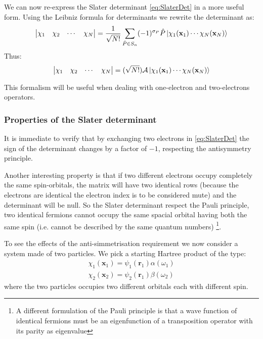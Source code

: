 \documentclass[a4paper,12pt]{article}
\begin{document}
We can now re-express the Slater determinant \eqref{eq:SlaterDet} in a more useful form. Using the Leibniz formula for determinants we rewrite the determinant as:
\begin{equation}\label{eq:SlaterLeibniz}
	\left|
	\begin{matrix}
		   \chi _1 & \chi _2 & \cdots  & \chi _N  \\
	\end{matrix} 
	\right| = \frac{1}{\sqrt{N!}} \sum_{\hat{P} \in S_n} (-1)^{\sigma_P} \hat{P} \ket{\chi_1(\mathbf{x}_1) \cdots   \chi_N(\mathbf{x}_N)}
\end{equation}
Thus:
\begin{equation}
	\left|
	\begin{matrix}
		   \chi _1 & \chi _2 & \cdots  & \chi _N  \\
	\end{matrix} 
	\right| =  (\sqrt{N!}) \mathcal{A} \ket{ \chi_1(\mathbf{x}_1) \cdots   \chi_N(\mathbf{x}_N) }
\end{equation}

This formalism will be useful when dealing with one-electron and two-electrons operators.

\subsubsection{Properties of the Slater determinant}

It is immediate to verify that by exchanging two electrons in \eqref{eq:SlaterDet} the sign of the determinant changes by a factor of $- 1$, respecting the antisymmetry principle.

Another interesting property is that if two different electrons occupy completely the same spin-orbitals, the matrix will have two identical rows (because the electrons are identical the electron index is to be considered mute) and the determinant will be null. So the Slater determinant respect the Pauli principle, two identical fermions cannot occupy the same spacial orbital having both the same spin (i.e. cannot be described by the same quantum numbers) \footnote{A different formulation of the Pauli principle is that a wave function of identical fermions must be an eigenfunction of a transposition operator with its parity as eigenvalue}.


To see the effects of the anti-simmetrisation requirement we now consider a system made of two particles. We pick a starting Hartree product of the type: 
\begin{align*}
	\chi_{1}(\mathbf{x}_{1}) = \psi_{1}(\mathbf{r}_{1}) \alpha(\omega_{1})\\
	\chi_{2}(\mathbf{x}_{2}) = \psi_{2}(\mathbf{r}_{1}) \beta(\omega_{2})
\end{align*}
where the two particles occupies two different orbitals each with different spin.
\end{document}

